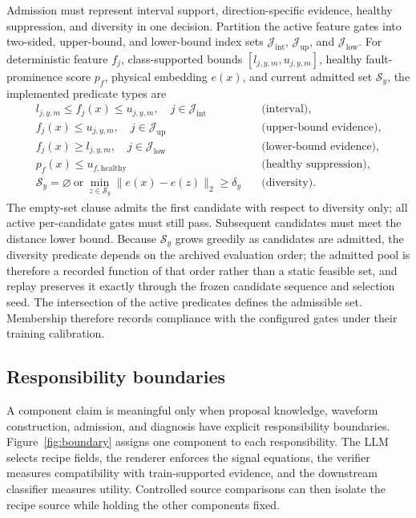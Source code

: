 \documentclass[a4paper,fleqn]{cas-sc}
\begin{document}
Admission must represent interval support, direction-specific evidence, healthy
suppression, and diversity in one decision. Partition the active feature gates
into two-sided, upper-bound, and lower-bound index sets
$\mathcal{J}_{\mathrm{int}}$, $\mathcal{J}_{\mathrm{up}}$, and
$\mathcal{J}_{\mathrm{low}}$. For deterministic feature $f_j$,
class-supported bounds $[l_{j,y,m},u_{j,y,m}]$, healthy fault-prominence score
$p_f$, physical embedding $e(x)$, and current admitted set $\mathcal{S}_y$, the
implemented predicate types are
\begin{align}
 l_{j,y,m}\leq f_j(x)\leq u_{j,y,m},\quad j\in\mathcal{J}_{\mathrm{int}}
   &\quad\text{(interval)},\nonumber\\
 f_j(x)\leq u_{j,y,m},\quad j\in\mathcal{J}_{\mathrm{up}}
   &\quad\text{(upper-bound evidence)},\nonumber\\
 f_j(x)\geq l_{j,y,m},\quad j\in\mathcal{J}_{\mathrm{low}}
   &\quad\text{(lower-bound evidence)},\nonumber\\
 p_f(x)\leq u_{f,\mathrm{healthy}}
   &\quad\text{(healthy suppression)},\nonumber\\
 \mathcal{S}_y=\varnothing\ \text{or}\
 \min_{z\in\mathcal{S}_y}\lVert e(x)-e(z)\rVert_2\geq\delta_y
   &\quad\text{(diversity)}.
 \label{eq:mixed-gates}
\end{align}
The empty-set clause admits the first candidate with respect to diversity only;
all active per-candidate gates must still pass. Subsequent candidates must meet
the distance lower bound. Because $\mathcal{S}_y$ grows greedily as candidates
are admitted, the diversity predicate depends on the archived evaluation
order; the admitted pool is therefore a recorded function of that order rather
than a static feasible set, and replay preserves it exactly through the frozen
candidate sequence and selection seed. The intersection of the active predicates defines the
admissible set.
Membership therefore records compliance with the configured gates under their
training calibration.

\subsection{Responsibility boundaries}

A component claim is meaningful only when proposal knowledge, waveform
construction, admission, and diagnosis have explicit responsibility
boundaries. Figure~\ref{fig:boundary}
assigns one component to each responsibility. The LLM selects recipe fields,
the renderer enforces the signal equations, the verifier measures compatibility
with train-supported evidence, and the downstream classifier measures utility.
Controlled source comparisons can then isolate the recipe source while holding the
other components fixed.
\end{document}
